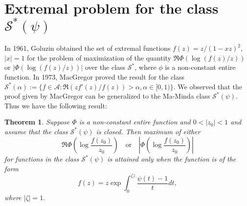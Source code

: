 \documentclass[12pt, reqno]{amsart}
\numberwithin{equation}{section}
\theoremstyle{plain}
\newtheorem{theorem}{Theorem}[section]
\theoremstyle{definition}
\theoremstyle{remark}
\begin{document}

\section{Extremal problem for the class $\mathcal{S}^*(\psi)$}
In 1961, Goluzin \cite{golu} obtained the set of extremal functions $f(z)=z/(1-xz)^2$, $|x|=1$ for the problem of maximization of the quantity 
$\Re\Phi\left(\log({f(z)}/{z})\right)$ or $\left|\Phi\left(\log({f(z)}/{z})\right)\right|$
over the class $\mathcal{S}^*$, where $\phi$ is a non-constant entire function. In 1973, MacGregor \cite{T.H.Mac1973} proved the result for the class $\mathcal{S}^*(\alpha):=\{f\in\mathcal{A}: \Re(zf'(z)/f(z))>\alpha, \alpha\in[0,1)\}$. We observed that the proof given by MacGregor can be generalized to the Ma-Minda class $\mathcal{S}^*(\psi)$. Thus we have the following result:
\begin{theorem}\label{mc1973}
	Suppose $\Phi$ is a non-constant entire function and $0<|z_0|<1$ and assume that the class $\mathcal{S}^{*}(\psi)$ is closed. Then maximum of either
	\begin{equation}\label{functinal1-2}
	\Re\Phi\left(\log\frac{f(z_0)}{z_0}\right) \quad\text{or}\quad 	\left|\Phi\left(\log\frac{f(z_0)}{z_0}\right)\right|
	\end{equation}
	for functions in the class $\mathcal{S}^{*}(\psi)$ is attained only when the function is of the form 
	\begin{equation}
	f(z)=z\exp\int_{0}^{\zeta z}\frac{\psi(t)-1}{t}dt,
	\end{equation}
	where $|\zeta|=1.$
\end{theorem}
\end{document}
